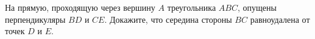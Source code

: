 \begin{ex}
	\begin{condition}
		На прямую, проходящую через вершину \( A \) треугольника \( ABC \), опущены перпендикуляры \( BD  \) и \( CE \). Докажите, что середина стороны \( BC  \) равноудалена от точек \( D  \) и \( E \).
	\end{condition}
\end{ex}